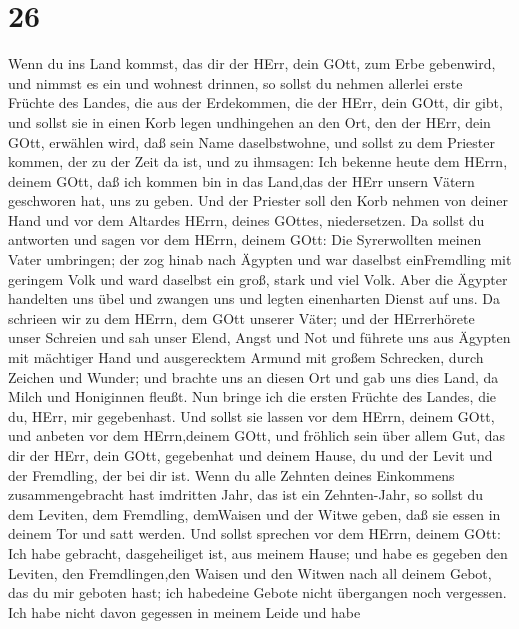 \hypertarget{section-25}{%
\section{26}\label{section-25}}

 Wenn du ins Land kommst, das dir der HErr, dein GOtt, zum
Erbe gebenwird, und nimmst es ein und wohnest drinnen,  so
sollst du nehmen allerlei erste Früchte des Landes, die aus der
Erdekommen, die der HErr, dein GOtt, dir gibt, und sollst sie in einen
Korb legen undhingehen an den Ort, den der HErr, dein GOtt, erwählen
wird, daß sein Name daselbstwohne,  und sollst zu dem
Priester kommen, der zu der Zeit da ist, und zu ihmsagen: Ich bekenne
heute dem HErrn, deinem GOtt, daß ich kommen bin in das Land,das der
HErr unsern Vätern geschworen hat, uns zu geben.  Und der
Priester soll den Korb nehmen von deiner Hand und vor dem Altardes
HErrn, deines GOttes, niedersetzen.  Da sollst du antworten
und sagen vor dem HErrn, deinem GOtt: Die Syrerwollten meinen Vater
umbringen; der zog hinab nach Ägypten und war daselbst einFremdling mit
geringem Volk und ward daselbst ein groß, stark und viel Volk.
 Aber die Ägypter handelten uns übel und zwangen uns und
legten einenharten Dienst auf uns.  Da schrieen wir zu dem
HErrn, dem GOtt unserer Väter; und der HErrerhörete unser Schreien und
sah unser Elend, Angst und Not  und führete uns aus Ägypten
mit mächtiger Hand und ausgerecktem Armund mit großem Schrecken, durch
Zeichen und Wunder;  und brachte uns an diesen Ort und gab
uns dies Land, da Milch und Honiginnen fleußt.  Nun bringe
ich die ersten Früchte des Landes, die du, HErr, mir gegebenhast. Und
sollst sie lassen vor dem HErrn, deinem GOtt, und anbeten vor dem
HErrn,deinem GOtt,  und fröhlich sein über allem Gut, das
dir der HErr, dein GOtt, gegebenhat und deinem Hause, du und der Levit
und der Fremdling, der bei dir ist.  Wenn du alle Zehnten
deines Einkommens zusammengebracht hast imdritten Jahr, das ist ein
Zehnten-Jahr, so sollst du dem Leviten, dem Fremdling, demWaisen und der
Witwe geben, daß sie essen in deinem Tor und satt werden. 
Und sollst sprechen vor dem HErrn, deinem GOtt: Ich habe gebracht,
dasgeheiliget ist, aus meinem Hause; und habe es gegeben den Leviten,
den Fremdlingen,den Waisen und den Witwen nach all deinem Gebot, das du
mir geboten hast; ich habedeine Gebote nicht übergangen noch vergessen.
 Ich habe nicht davon gegessen in meinem Leide und habe
